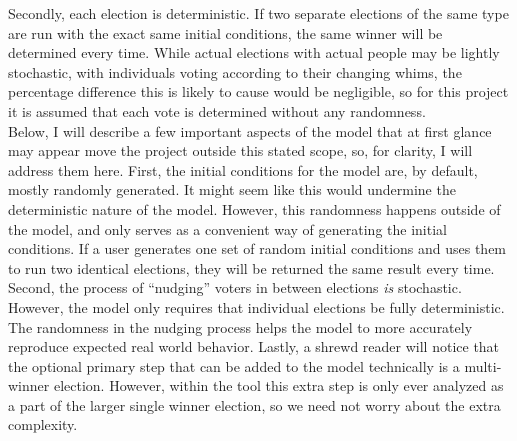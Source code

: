 \documentclass[12pt]{article}
\newcounter{step}
\begin{document}
\qquad Secondly, each election is deterministic. If two separate elections of the same type are run with the exact same initial conditions, the same winner will be determined every time. While actual elections with actual people may be lightly stochastic, with individuals voting according to their changing whims, the percentage difference this is likely to cause would be negligible, so for this project it is assumed that each vote is determined without any randomness. \\

\qquad Below, I will describe a few important aspects of the model that at first glance may appear move the project outside this stated scope, so, for clarity, I will address them here. First, the initial conditions for the model are, by default, mostly randomly generated. It might seem like this would undermine the deterministic nature of the model. However, this randomness happens outside of the model, and only serves as a convenient way of generating the initial conditions. If a user generates one set of random initial conditions and uses them to run two identical elections, they will be returned the same result every time. Second, the process of ``nudging'' voters in between elections \textit{is} stochastic. However, the model only requires that individual elections be fully deterministic. The randomness in the nudging process helps the model to more accurately reproduce expected real world behavior. Lastly, a shrewd reader will notice that the optional primary step that can be added to the model technically is a multi-winner election. However, within the tool this extra step is only ever analyzed as a part of the larger single winner election, so we need not worry about the extra complexity. \\

\end{document}
